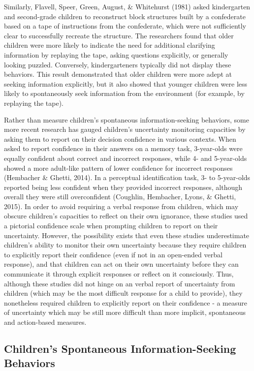 \documentclass[floatsintext,man]{apa6}
\theoremstyle{definition}
\theoremstyle{definition}
\theoremstyle{definition}
\theoremstyle{remark}
\begin{document}
Similarly, Flavell, Speer, Green, August, \& Whitehurst (1981) asked
kindergarten and second-grade children to reconstruct block structures
built by a confederate based on a tape of instructions from the
confederate, which were not sufficiently clear to successfully recreate
the structure. The researchers found that older children were more
likely to indicate the need for additional clarifying information by
replaying the tape, asking questions explicitly, or generally looking
puzzled. Conversely, kindergarteners typically did not display these
behaviors. This result demonstrated that older children were more adept
at seeking information explicitly, but it also showed that younger
children were less likely to spontaneously seek information from the
environment (for example, by replaying the tape).

Rather than measure children's spontaneous information-seeking
behaviors, some more recent research has gauged children's uncertainty
monitoring capacities by asking them to report on their decision
confidence in various contexts. When asked to report confidence in their
answers on a memory task, 3-year-olds were equally confident about
correct and incorrect responses, while 4- and 5-year-olds showed a more
adult-like pattern of lower confidence for incorrect responses
(Hembacher \& Ghetti, 2014). In a perceptual identification task, 3- to
5-year-olds reported being less confident when they provided incorrect
responses, although overall they were still overconfident (Coughlin,
Hembacher, Lyons, \& Ghetti, 2015). In order to avoid requiring a verbal
response from children, which may obscure children's capacities to
reflect on their own ignorance, these studies used a pictorial
confidence scale when prompting children to report on their uncertainty.
However, the possibility exists that even these studies underestimate
children's ability to monitor their own uncertainty because they require
children to explicitly report their confidence (even if not in an
open-ended verbal response), and that children can act on their own
uncertainty before they can communicate it through explicit responses or
reflect on it consciously. Thus, although these studies did not hinge on
an verbal report of uncertainty from children (which may be the most
difficult response for a child to provide), they nonetheless required
children to explicitly report on their confidence - a measure of
uncertainty which may be still more difficult than more implicit,
spontaneous and action-based measures.

\subsection{Children's Spontaneous Information-Seeking
Behaviors}\label{childrens-spontaneous-information-seeking-behaviors}
\end{document}

